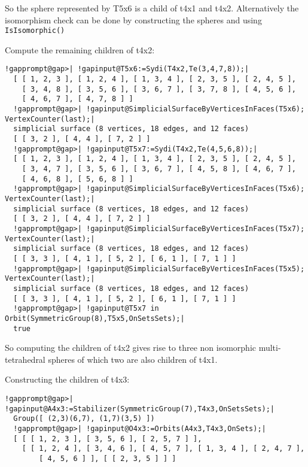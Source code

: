 \documentclass[a4paper,11pt]{report}
\begin{document}
{{{ 
\begin{center}

\end{center}
 

 So the sphere represented by T5x6 is a child of t4x1 and t4x2. Alternatively
the isomorphism check can be done by constructing the spheres and using \texttt{IsIsomorphic()} 

 Compute the remaining children of t4x2: 

 
\begin{Verbatim}[commandchars=!@|,fontsize=\small,frame=single,label=Example]
  !gapprompt@gap>| !gapinput@T5x6:=Sydi(T4x2,Te(3,4,7,8));|
  [ [ 1, 2, 3 ], [ 1, 2, 4 ], [ 1, 3, 4 ], [ 2, 3, 5 ], [ 2, 4, 5 ], 
    [ 3, 4, 8 ], [ 3, 5, 6 ], [ 3, 6, 7 ], [ 3, 7, 8 ], [ 4, 5, 6 ], 
    [ 4, 6, 7 ], [ 4, 7, 8 ] ]
  !gapprompt@gap>| !gapinput@SimplicialSurfaceByVerticesInFaces(T5x6); VertexCounter(last);|
  simplicial surface (8 vertices, 18 edges, and 12 faces)
  [ [ 3, 2 ], [ 4, 4 ], [ 7, 2 ] ]
  !gapprompt@gap>| !gapinput@T5x7:=Sydi(T4x2,Te(4,5,6,8));|
  [ [ 1, 2, 3 ], [ 1, 2, 4 ], [ 1, 3, 4 ], [ 2, 3, 5 ], [ 2, 4, 5 ], 
    [ 3, 4, 7 ], [ 3, 5, 6 ], [ 3, 6, 7 ], [ 4, 5, 8 ], [ 4, 6, 7 ], 
    [ 4, 6, 8 ], [ 5, 6, 8 ] ]
  !gapprompt@gap>| !gapinput@SimplicialSurfaceByVerticesInFaces(T5x6); VertexCounter(last);|
  simplicial surface (8 vertices, 18 edges, and 12 faces)
  [ [ 3, 2 ], [ 4, 4 ], [ 7, 2 ] ]
  !gapprompt@gap>| !gapinput@SimplicialSurfaceByVerticesInFaces(T5x7); VertexCounter(last);|
  simplicial surface (8 vertices, 18 edges, and 12 faces)
  [ [ 3, 3 ], [ 4, 1 ], [ 5, 2 ], [ 6, 1 ], [ 7, 1 ] ]
  !gapprompt@gap>| !gapinput@SimplicialSurfaceByVerticesInFaces(T5x5); VertexCounter(last);|
  simplicial surface (8 vertices, 18 edges, and 12 faces)
  [ [ 3, 3 ], [ 4, 1 ], [ 5, 2 ], [ 6, 1 ], [ 7, 1 ] ]
  !gapprompt@gap>| !gapinput@T5x7 in Orbit(SymmetricGroup(8),T5x5,OnSetsSets);|
  true
\end{Verbatim}
 

 So computing the children of t4x2 gives rise to three non isomorphic multi-
tetrahedral spheres of which two are also children of t4x1. 

 Constructing the children of t4x3: 

 
\begin{Verbatim}[commandchars=!@|,fontsize=\small,frame=single,label=Example]
  !gapprompt@gap>| !gapinput@A4x3:=Stabilizer(SymmetricGroup(7),T4x3,OnSetsSets);|
  Group([ (2,3)(6,7), (1,7)(3,5) ])
  !gapprompt@gap>| !gapinput@O4x3:=Orbits(A4x3,T4x3,OnSets);|
  [ [ [ 1, 2, 3 ], [ 3, 5, 6 ], [ 2, 5, 7 ] ], 
    [ [ 1, 2, 4 ], [ 3, 4, 6 ], [ 4, 5, 7 ], [ 1, 3, 4 ], [ 2, 4, 7 ], 
        [ 4, 5, 6 ] ], [ [ 2, 3, 5 ] ] ]
\end{Verbatim}
 

}}}
\end{document}
